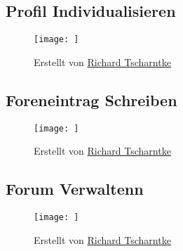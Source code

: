 \subsection*{Profil Individualisieren}
\begin{figure}[h!]
	\centering
	\texttt{[image: ]}
	\label{fig:ActDia_Profil_Individualisieren}
	\caption*{Erstellt von \hyperref[person:RichardTscharntke]{Richard Tscharntke}}
\end{figure}

\subsection*{Foreneintrag Schreiben}
\begin{figure}[h!]
	\centering
	\texttt{[image: ]}
	\label{fig:ActDia_Foreneinntrag_Schreiben}
	\caption*{Erstellt von \hyperref[person:RichardTscharntke]{Richard Tscharntke}}
\end{figure}

\subsection*{Forum Verwaltenn}
\begin{figure}[h!]
\centering
\texttt{[image: ]}
\label{fig:ActDia_Forum-Verwalten}
\caption*{Erstellt von \hyperref[person:RichardTscharntke]{Richard Tscharntke}}
\end{figure}